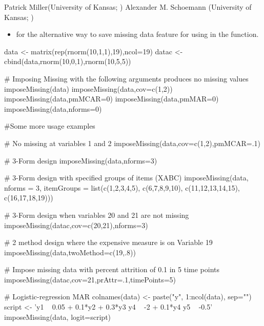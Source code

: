 \documentclass[a4paper]{book}
\begin{document}
%
\begin{Author}\relax
Patrick Miller(University of Kansas; )
Alexander M. Schoemann (University of Kansas; )  

\end{Author}
%
\begin{SeeAlso}\relax
\begin{itemize}

\item {} for the alternative way to save missing data feature for using in the  function.


\end{itemize}

\end{SeeAlso}
%
\begin{Examples}
\begin{ExampleCode}
data <- matrix(rep(rnorm(10,1,1),19),ncol=19)
datac <- cbind(data,rnorm(10,0,1),rnorm(10,5,5))

# Imposing Missing with the following arguments produces no missing values
imposeMissing(data)
imposeMissing(data,cov=c(1,2))
imposeMissing(data,pmMCAR=0)
imposeMissing(data,pmMAR=0)
imposeMissing(data,nforms=0)

#Some more usage examples

# No missing at variables 1 and 2
imposeMissing(data,cov=c(1,2),pmMCAR=.1)

# 3-Form design
imposeMissing(data,nforms=3)

# 3-Form design with specified groups of items (XABC)
imposeMissing(data, nforms = 3, itemGroups =
	list(c(1,2,3,4,5), c(6,7,8,9,10), c(11,12,13,14,15), c(16,17,18,19)))

# 3-Form design when variables 20 and 21 are not missing
imposeMissing(datac,cov=c(20,21),nforms=3)

# 2 method design where the expensive measure is on Variable 19
imposeMissing(data,twoMethod=c(19,.8))

# Impose missing data with percent attrition of 0.1 in 5 time points
imposeMissing(datac,cov=21,prAttr=.1,timePoints=5)

# Logistic-regression MAR
colnames(data) <- paste("y", 1:ncol(data), sep="")
script <- 'y1 ~ 0.05 + 0.1*y2 + 0.3*y3
		y4 ~ -2 + 0.1*y4
		y5 ~ -0.5'
imposeMissing(data, logit=script)
\end{ExampleCode}
\end{Examples}
\end{document}
